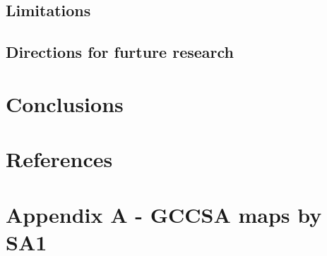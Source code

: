 \documentclass[preprint, 3p,
authoryear]{elsarticle} %
\begin{document}
\subsection{Limitations}\label{limitations}

\subsection{Directions for furture
research}\label{directions-for-furture-research}

\section{Conclusions}\label{conclusions}

\section*{References}\label{references}

\section{Appendix A - GCCSA maps by
SA1}\label{appendix-a---gccsa-maps-by-sa1}

\renewcommand\refname{Holding for spare stuff}

\end{document}
